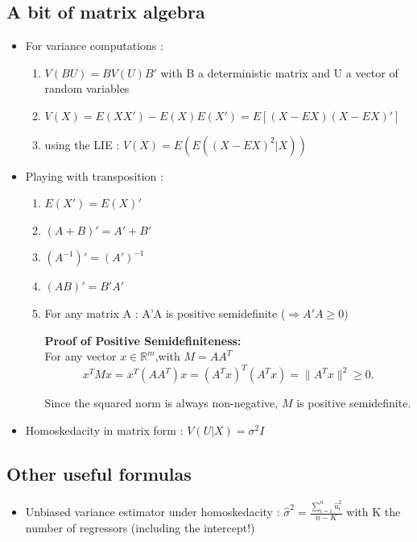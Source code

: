 \documentclass{article}
\begin{document}
\subsection{A bit of matrix algebra}
\begin{itemize}
    \item For variance computations : 
    \begin{enumerate}
        \item $V(BU) = BV(U)B'$ with B a deterministic matrix and U a vector of random variables
        \item $V(X) = E(XX') - E(X)E(X') = E[(X-EX)(X-EX)']$
        \item using the LIE : $V(X) = E(E((X-EX)^2|X))$
    \end{enumerate}
    \item Playing with transposition : 
    \begin{enumerate}
        \item $E(X') = E(X)'$
        \item $(A+B)'=A'+B'$
        \item $(A^{-1})'=(A')^{-1}$
        \item $(AB)'=B'A'$
        \item For any matrix A : A'A is positive semidefinite ($\Longrightarrow A'A \geq0)$
        \begin{proofbox}
            \textbf{Proof of Positive Semidefiniteness:}\\
    For any vector $x \in \mathbb{R}^m$,with $M=AA^T$
    $$    x^T M x = x^T (A A^T) x = (A^T x)^T (A^T x) = \|A^T x\|^2 \ge 0.    $$
    
    Since the squared norm is always non-negative, $M$ is positive semidefinite.
        \end{proofbox}
    \end{enumerate}
    \item Homoskedacity in matrix form : $V(U|X) = \sigma^2I$ 
\end{itemize}
\subsection{Other useful formulas}
\begin{itemize}
    \item Unbiased variance estimator under homoskedacity : $\hat{\sigma}^2= \frac{\sum_{i=1}^n \hat{u}_i^2}{n-K}$ with K the number of regressors (including the intercept!)
\end{itemize}
\end{document}

